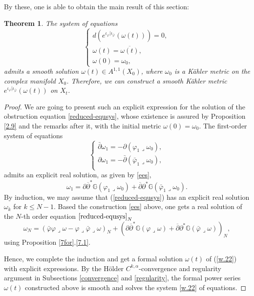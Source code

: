 \documentclass[12pt]{amsart}
\numberwithin{equation}{section}
\newtheorem{theorem} {Theorem} [section]
\renewcommand{\1}{\mathds{1}}
\newcommand{\G}{\mathbb{G}}
\newcommand{\db}{\overline{\partial}}
\renewcommand{\>}{\rightarrow}
\newcommand{\p}{\partial}
\def\p{\partial}
\def\o{\overline}
\def\b{\bar}
\def\l{\lrcorner}
\begin{document}
By these, one is able to obtain the main result of this section:
\begin{theorem}\label{main}
  The system of equations
  \begin{equation}\label{w.22}
    \begin{cases}
      d(e^{\iota_{\varphi}|\iota_{\b{\varphi}}}(\omega(t)))=0,\\
      \omega(t)=\o{\omega(t)},\\
      \omega(0)=\omega_0,
    \end{cases}
  \end{equation}
admits a smooth solution $\omega(t)\in A^{1,1}(X_0)$, where
$\omega_0$ is a K\"{a}hler metric on the complex manifold $X_0$.
Therefore, we can construct a smooth K\"{a}hler metric
$e^{\iota_{\varphi}|\iota_{\b{\varphi}}}(\omega(t))$ on ${X}_t$.
\end{theorem}
\begin{proof}
We are going to present such an explicit expression for the solution
of the obstruction equation \eqref{reduced-equsys}, whose existence
is assured by Proposition \ref{2.9} and the remarks after it, with
the initial metric $\omega(0)=\omega_0$. The first-order system of equations
$$\label{a-reduced-equsys}
    \begin{cases}
      \b{\p}\omega_1=-\p(\varphi_1\l\omega_0),\\
      \p\omega_1=-\b{\p}(\b{\varphi}_1\l\omega_0),\\
    \end{cases}
$$
admits an explicit real solution, as given by \eqref{ees},
\[ \omega_1 = \p\db^*\G(\varphi_1\l\omega_0)+\db\p^*\G(\b{\varphi}_1\l\omega_0). \]
By induction, we may assume that (\ref{reduced-equsys}) has an
explicit real solution $\omega_k$ for $k\leq N-1$. Based the
construction \eqref{ees} above, one gets a real solution of
the $N$-th order equation $\eqref{reduced-equsys}_N$
$$\label{sol-reduced-equsys}
\omega_N=(\b{\varphi}\varphi\l\omega-\varphi\l\b{\varphi}\l\omega)_N+\left(\p\db^*\G(\varphi\l\omega)+\db\p^*\G(\b{\varphi}\l\omega)\right)_{N},
$$
using Proposition \ref{7for}.\eqref{7.1}.

Hence, we complete the induction and get a formal solution
$\omega(t)$ of (\ref{w.22}) with explicit expressions. By the  H\"older
$C^{k,\alpha}$-convergence and regularity argument in Subsections
\ref{convergence} and \ref{regularity}, the formal power series
$\omega(t)$ constructed above is smooth and solves the system
\eqref{w.22} of equations.
\end{proof}
\end{document}
